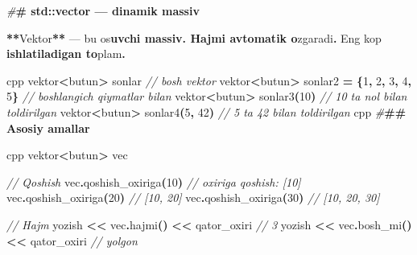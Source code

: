 \documentclass[a4paper,11pt,twoside,openright]{book}
\newenvironment{Shaded}{\begin{snugshade}}{\end{snugshade}}
\newcommand{\CharTok}[1]{\textcolor[rgb]{0.31,0.60,0.02}{#1}}
\newcommand{\CommentTok}[1]{\textcolor[rgb]{0.56,0.35,0.01}{\textit{#1}}}
\newcommand{\DecValTok}[1]{\textcolor[rgb]{0.00,0.00,0.81}{#1}}
\newcommand{\ErrorTok}[1]{\textcolor[rgb]{0.64,0.00,0.00}{\textbf{#1}}}
\newcommand{\NormalTok}[1]{#1}
\newcommand{\OperatorTok}[1]{\textcolor[rgb]{0.81,0.36,0.00}{\textbf{#1}}}
\newcommand{\PreprocessorTok}[1]{\textcolor[rgb]{0.56,0.35,0.01}{\textit{#1}}}
\begin{document}
\begin{Shaded}
\begin{Highlighting}[]
\PreprocessorTok{\#}\ErrorTok{\# \textasciigrave{}std::vector\textasciigrave{} — dinamik massiv}

\OperatorTok{**}\NormalTok{Vektor}\OperatorTok{**}\NormalTok{ — bu o}\CharTok{\textquotesingle{}s}\ErrorTok{uvchi massiv. Hajmi avtomatik o}\CharTok{\textquotesingle{}}\NormalTok{zgaradi}\OperatorTok{.}\NormalTok{ Eng ko}\CharTok{\textquotesingle{}p}\ErrorTok{ ishlatiladigan to}\CharTok{\textquotesingle{}}\NormalTok{plam}\OperatorTok{.}

\ErrorTok{\textasciigrave{}\textasciigrave{}\textasciigrave{}}\NormalTok{cpp}
\NormalTok{vektor}\OperatorTok{\textless{}}\NormalTok{butun}\OperatorTok{\textgreater{}}\NormalTok{ sonlar              }\CommentTok{// bo\textquotesingle{}sh vektor}
\NormalTok{vektor}\OperatorTok{\textless{}}\NormalTok{butun}\OperatorTok{\textgreater{}}\NormalTok{ sonlar2 }\OperatorTok{=} \OperatorTok{\{}\DecValTok{1}\OperatorTok{,} \DecValTok{2}\OperatorTok{,} \DecValTok{3}\OperatorTok{,} \DecValTok{4}\OperatorTok{,} \DecValTok{5}\OperatorTok{\}}  \CommentTok{// boshlang\textquotesingle{}ich qiymatlar bilan}
\NormalTok{vektor}\OperatorTok{\textless{}}\NormalTok{butun}\OperatorTok{\textgreater{}}\NormalTok{ sonlar3}\OperatorTok{(}\DecValTok{10}\OperatorTok{)}         \CommentTok{// 10 ta nol bilan to\textquotesingle{}ldirilgan}
\NormalTok{vektor}\OperatorTok{\textless{}}\NormalTok{butun}\OperatorTok{\textgreater{}}\NormalTok{ sonlar4}\OperatorTok{(}\DecValTok{5}\OperatorTok{,} \DecValTok{42}\OperatorTok{)}     \CommentTok{// 5 ta 42 bilan to\textquotesingle{}ldirilgan}
\ErrorTok{\textasciigrave{}\textasciigrave{}\textasciigrave{}}\NormalTok{cpp}
\PreprocessorTok{\#}\ErrorTok{\#\# Asosiy amallar}

\ErrorTok{\textasciigrave{}\textasciigrave{}\textasciigrave{}}\NormalTok{cpp}
\NormalTok{vektor}\OperatorTok{\textless{}}\NormalTok{butun}\OperatorTok{\textgreater{}}\NormalTok{ vec}

\CommentTok{// Qo\textquotesingle{}shish}
\NormalTok{vec}\OperatorTok{.}\NormalTok{qoshish\_oxiriga}\OperatorTok{(}\DecValTok{10}\OperatorTok{)}      \CommentTok{// oxiriga qo\textquotesingle{}shish: [10]}
\NormalTok{vec}\OperatorTok{.}\NormalTok{qoshish\_oxiriga}\OperatorTok{(}\DecValTok{20}\OperatorTok{)}      \CommentTok{// [10, 20]}
\NormalTok{vec}\OperatorTok{.}\NormalTok{qoshish\_oxiriga}\OperatorTok{(}\DecValTok{30}\OperatorTok{)}      \CommentTok{// [10, 20, 30]}

\CommentTok{// Hajm}
\NormalTok{yozish }\OperatorTok{\textless{}\textless{}}\NormalTok{ vec}\OperatorTok{.}\NormalTok{hajmi}\OperatorTok{()} \OperatorTok{\textless{}\textless{}}\NormalTok{ qator\_oxiri     }\CommentTok{// 3}
\NormalTok{yozish }\OperatorTok{\textless{}\textless{}}\NormalTok{ vec}\OperatorTok{.}\NormalTok{bosh\_mi}\OperatorTok{()} \OperatorTok{\textless{}\textless{}}\NormalTok{ qator\_oxiri   }\CommentTok{// yolg\textquotesingle{}on}


\end{Highlighting}
\end{Shaded}
\end{document}

